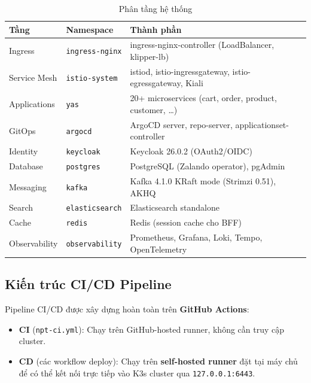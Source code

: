 \begin{table}[H]
  \centering
  \caption{Phân tầng hệ thống}
  \begin{tabularx}{\textwidth}{L{3cm}L{5cm}X}
    \toprule
    \textbf{Tầng} & \textbf{Namespace} & \textbf{Thành phần} \\
    \midrule
    Ingress & \texttt{ingress-nginx} & ingress-nginx-controller (LoadBalancer, klipper-lb) \\
    \midrule
    Service Mesh & \texttt{istio-system} & istiod, istio-ingressgateway, istio-egressgateway, Kiali \\
    \midrule
    Applications & \texttt{yas} & 20+ microservices (cart, order, product, customer, …) \\
    \midrule
    GitOps & \texttt{argocd} & ArgoCD server, repo-server, applicationset-controller \\
    \midrule
    Identity & \texttt{keycloak} & Keycloak 26.0.2 (OAuth2/OIDC) \\
    \midrule
    Database & \texttt{postgres} & PostgreSQL (Zalando operator), pgAdmin \\
    \midrule
    Messaging & \texttt{kafka} & Kafka 4.1.0 KRaft mode (Strimzi 0.51), AKHQ \\
    \midrule
    Search & \texttt{elasticsearch} & Elasticsearch standalone \\
    \midrule
    Cache & \texttt{redis} & Redis (session cache cho BFF) \\
    \midrule
    Observability & \texttt{observability} & Prometheus, Grafana, Loki, Tempo, OpenTelemetry \\
    \bottomrule
  \end{tabularx}
\end{table}

\subsection{Kiến trúc CI/CD Pipeline}

Pipeline CI/CD được xây dựng hoàn toàn trên \textbf{GitHub Actions}:

\begin{itemize}
  \item \textbf{CI} (\texttt{npt-ci.yml}): Chạy trên GitHub-hosted runner, không cần truy cập cluster.
  \item \textbf{CD} (các workflow deploy): Chạy trên \textbf{self-hosted runner} đặt tại máy chủ
        để có thể kết nối trực tiếp vào K3s cluster qua \texttt{127.0.0.1:6443}.
\end{itemize}

